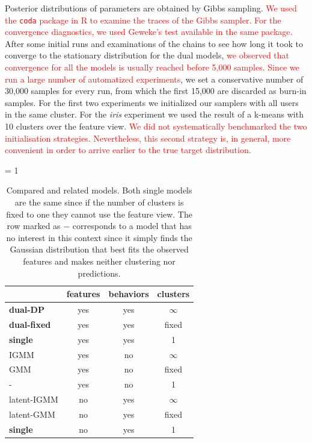 \documentclass[smallextended]{svjour3}          %
\newcommand\alberto[1]{\textcolor{red}{#1}}
\begin{document}
Posterior distributions of parameters are obtained by Gibbs sampling. \alberto{We used the \texttt{coda} package in R \citep{coda} to examine the traces of the Gibbs sampler. For the convergence diagnostics, we used Geweke's test available in the same package.} After some initial runs and examinations of the chains to see how long it took to converge to the stationary distribution for the dual models, \alberto{we observed that convergence for all the models is usually reached before 5,000 samples. Since we run a large number of automatized experiments}, we set a conservative number of 30,000 samples for every run, from which the first 15,000 are discarded as burn-in samples. 
For the first two experiments we initialized our samplers with all users in the same cluster. For the \textit{iris} experiment we used the result of a k-means with 10 clusters over the feature view. \alberto{We did not systematically benchmarked the two initialisation strategies. Nevertheless, this second strategy is, in general, more convenient in order to arrive earlier to the true target distribution.}
\begin{table}[ht]
\caption{Compared and related models. Both single models are the same since if the number of clusters is fixed to one they cannot use the feature view. The row marked as $-$ corresponds to a model that has no interest in this context since it simply finds the Gaussian distribution that best fits the observed features and makes neither clustering nor predictions.} 
 \begin{center}
   \tabcolsep = 1\tabcolsep
   \begin{tabular}{lccc}
   \hline\hline
                & features & behaviors & clusters\\
   \hline
   \textbf{dual-DP}    & yes & yes   & $\infty$\\
   \textbf{dual-fixed} & yes & yes   & fixed   \\
   \textbf{single}     & yes & yes   & 1 \\
   IGMM     & yes & no    & $\infty$ \\
   GMM        & yes & no    & fixed \\
   -          & yes & no    & 1 \\
   latent-IGMM & no  & yes   & $\infty$ \\
   latent-GMM    & no  & yes   & fixed \\
   \textbf{single}     & no  & yes   & 1 \\   
   \hline
   \end{tabular}
\label{tab:models}
 \end{center}
\end{table}
\end{document}
